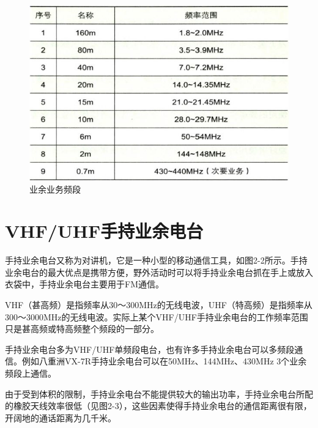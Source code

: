 \documentclass[12pt,UTF8]{ctexbook}
\begin{document}
\begin{figure}[htbp]
	\centering
	\includegraphics[width=0.7\linewidth]{18}
	\caption{业余业务频段}
	\label{fig:1}
\end{figure}

\section{VHF/UHF手持业余电台}

手持业余电台又称为对讲机，它是一种小型的移动通信工具，如图2-2所示。手持业余电台的最大优点是携带方便，野外活动时可以将手持业余电台抓在手上或放入衣袋中，手持业余电台主要用于FM通信。

VHF（甚高频）是指频率从30～300MHz的无线电波，UHF（特高频）是指频率从300～3000MHz的无线电波。实际上某个VHF/UHF手持业余电台的工作频率范围只是甚高频或特高频整个频段的一部分。

手持业余电台多为VHF/UHF单频段电台，也有许多手持业余电台可以多频段通信。例如八重洲VX-7R手持业余电台可以在50MHz、144MHz、430MHz 3个业余频段上通信。

由于受到体积的限制，手持业余电台不能提供较大的输出功率，手持业余电台所配的橡胶天线效率很低（见图2-3），这些因素使得手持业余电台的通信距离很有限，开阔地的通话距离为几千米。
\end{document}
